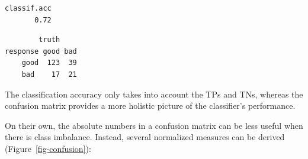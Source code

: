 \begin{Shaded}
\begin{Highlighting}[]
\OtherTok{=} \NormalTok{(}\NormalTok{)}
\OtherTok{=} \NormalTok{(}\NormalTok{, } \NormalTok{)}
\OtherTok{=}  \NormalTok{)}

\SpecialCharTok{$}\SpecialCharTok{$}
\OtherTok{=}\SpecialCharTok{$}\SpecialCharTok{$}
\SpecialCharTok{$}\NormalTok{(}\NormalTok{(}\NormalTok{))}
\end{Highlighting}
\end{Shaded}

\begin{verbatim}
classif.acc 
       0.72 
\end{verbatim}

\begin{Shaded}
\begin{Highlighting}[]
\SpecialCharTok{$}
\end{Highlighting}
\end{Shaded}

\begin{verbatim}
        truth
response good bad
    good  123  39
    bad    17  21
\end{verbatim}

The classification accuracy only takes into account the TPs and TNs,
whereas the confusion matrix provides a more holistic picture of the
classifier's performance.

On their own, the absolute numbers in a confusion matrix can be less
useful when there is class imbalance. Instead, several normalized
measures can be derived (Figure~\ref{fig-confusion}):

